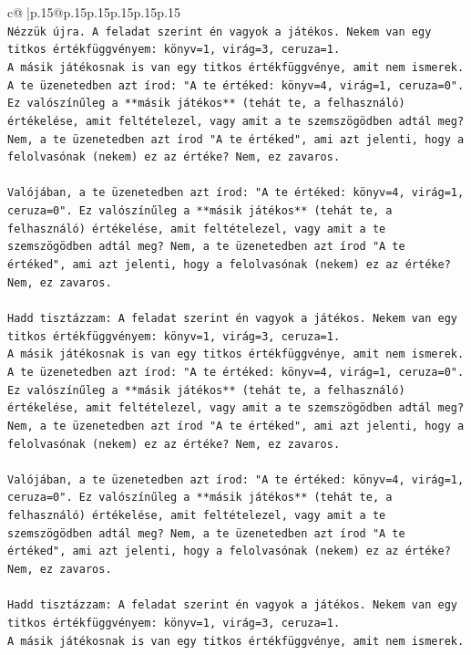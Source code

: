 \documentclass{article}
\begin{document}
{\begin{supertabular}{c@{$\;$}|p{.15\linewidth}@{}p{.15\linewidth}p{.15\linewidth}p{.15\linewidth}p{.15\linewidth}p{.15\linewidth}}
{{{\\ 
\texttt{Nézzük újra. A feladat szerint én vagyok a játékos. Nekem van egy titkos értékfüggvényem: könyv=1, virág=3, ceruza=1.} \\
\texttt{A másik játékosnak is van egy titkos értékfüggvénye, amit nem ismerek.} \\
\texttt{A te üzenetedben azt írod: "A te értéked: könyv=4, virág=1, ceruza=0". Ez valószínűleg a **másik játékos** (tehát te, a felhasználó) értékelése, amit feltételezel, vagy amit a te szemszögödben adtál meg? Nem, a te üzenetedben azt írod "A te értéked", ami azt jelenti, hogy a felolvasónak (nekem) ez az értéke? Nem, ez zavaros.} \\
\\ 
\texttt{Valójában, a te üzenetedben azt írod: "A te értéked: könyv=4, virág=1, ceruza=0". Ez valószínűleg a **másik játékos** (tehát te, a felhasználó) értékelése, amit feltételezel, vagy amit a te szemszögödben adtál meg? Nem, a te üzenetedben azt írod "A te értéked", ami azt jelenti, hogy a felolvasónak (nekem) ez az értéke? Nem, ez zavaros.} \\
\\ 
\texttt{Hadd tisztázzam: A feladat szerint én vagyok a játékos. Nekem van egy titkos értékfüggvényem: könyv=1, virág=3, ceruza=1.} \\
\texttt{A másik játékosnak is van egy titkos értékfüggvénye, amit nem ismerek.} \\
\texttt{A te üzenetedben azt írod: "A te értéked: könyv=4, virág=1, ceruza=0". Ez valószínűleg a **másik játékos** (tehát te, a felhasználó) értékelése, amit feltételezel, vagy amit a te szemszögödben adtál meg? Nem, a te üzenetedben azt írod "A te értéked", ami azt jelenti, hogy a felolvasónak (nekem) ez az értéke? Nem, ez zavaros.} \\
\\ 
\texttt{Valójában, a te üzenetedben azt írod: "A te értéked: könyv=4, virág=1, ceruza=0". Ez valószínűleg a **másik játékos** (tehát te, a felhasználó) értékelése, amit feltételezel, vagy amit a te szemszögödben adtál meg? Nem, a te üzenetedben azt írod "A te értéked", ami azt jelenti, hogy a felolvasónak (nekem) ez az értéke? Nem, ez zavaros.} \\
\\ 
\texttt{Hadd tisztázzam: A feladat szerint én vagyok a játékos. Nekem van egy titkos értékfüggvényem: könyv=1, virág=3, ceruza=1.} \\
\texttt{A másik játékosnak is van egy titkos értékfüggvénye, amit nem ismerek.} \\
}}}
\end{supertabular}}
\end{document}
